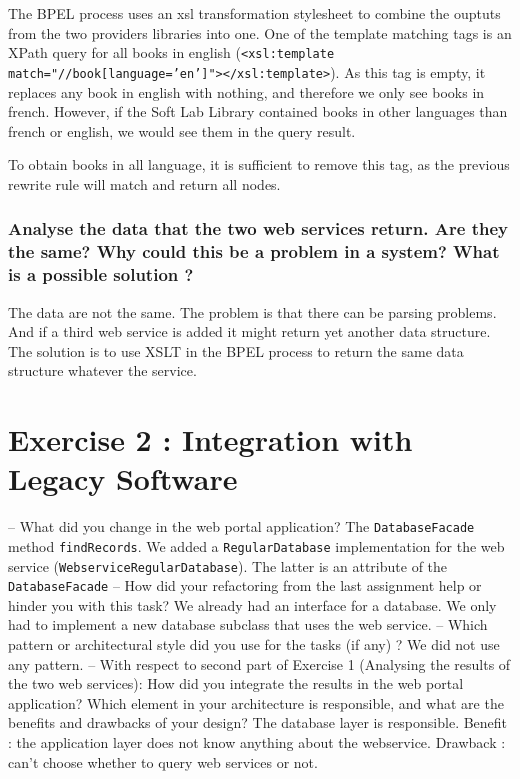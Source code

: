 The BPEL process uses an xsl transformation stylesheet to combine the ouptuts from the two providers libraries into one. One of the template matching tags is an XPath query for all books in english (\texttt{<xsl:template match="//book[language='en']"></xsl:template>}). As this tag is empty, it replaces any book in english with nothing, and therefore we only see books in french. However, if the Soft Lab Library contained books in other languages than french or english, we would see them in the query result.

To obtain books in all language, it is sufficient to remove this tag, as the previous rewrite rule will match and return all nodes.

\subsubsection{Analyse the data that the two web services return. Are they the same? Why could this be a problem in a system? What is a possible solution ?}

The data are not the same. The problem is that there can be parsing problems. And if a third web service is added it might return yet another data structure. The solution is to use XSLT in the BPEL process to return the same data structure whatever the service.

\section{Exercise 2 : Integration with Legacy Software}

    – What did you change in the web portal application?
    The \texttt{DatabaseFacade} method \texttt{findRecords}. We added a \texttt{RegularDatabase} implementation for the web service (\texttt{WebserviceRegularDatabase}). The latter is an attribute of the \texttt{DatabaseFacade}
    – How did your refactoring from the last assignment help or hinder you with
    this task?
    We already had an interface for a database. We only had to implement a new database subclass that uses the web service.
    – Which pattern or architectural style did you use for the tasks (if any) ?
    We did not use any pattern.
    – With respect to second part of Exercise 1 (Analysing the results of the two
    web services): How did you integrate the results in the web portal application?
    Which element in your architecture is responsible, and what are the benefits
    and drawbacks of your design?
    The database layer is responsible. Benefit : the application layer does not know anything about the webservice. Drawback : can't choose whether to query web services or not.

